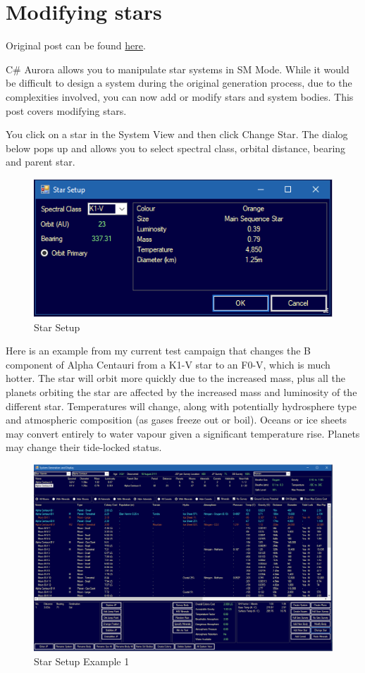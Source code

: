 \documentclass[../Aurora C# unofficial manual.tex]{subfiles}
\begin{document}
	\section{Modifying stars}\label{1_modifying_stars}
	Original post can be found
	\href{http://aurora2.pentarch.org/index.php?topic=8495.msg118725#msg118725}{here}.
	\newline\newline
	
	C\# Aurora allows you to manipulate star systems in SM Mode. While it would be difficult to design a system during the original generation process, due to the complexities involved, you can now add or modify stars and system bodies. This post covers modifying stars.
	
	You click on a star in the System View and then click Change Star. The dialog below pops up and allows you to select spectral class, orbital distance, bearing and parent star.
	\begin{figure}[h]
		\centering
		\includegraphics[width=0.5\linewidth]{images/StarSetup}
		\caption[Star Setup]{Star Setup}
		\label{fig:starsetup}
	\end{figure}
	Here is an example from my current test campaign that changes the B component of Alpha Centauri from a K1-V star to an F0-V, which is much hotter. The star will orbit more quickly due to the increased mass, plus all the planets orbiting the star are affected by the increased mass and luminosity of the different star. Temperatures will change, along with potentially hydrosphere type and atmospheric composition (as gases freeze out or boil). Oceans or ice sheets may convert entirely to water vapour given a significant temperature rise. Planets may change their tide-locked status.
	\begin{figure}[H]
		\centering
		\includegraphics[width=0.95\linewidth]{images/StarSetupExample}
		\caption[Star Setup Example]{Star Setup Example 1}
		\label{fig:starsetupexample}
	\end{figure}
\end{document}
